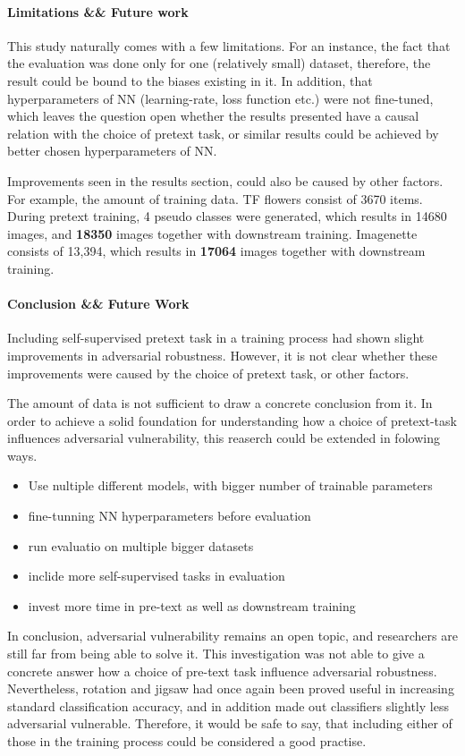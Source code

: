\paragraph{Limitations \&\& Future work}
This study naturally comes with a few limitations.
For an instance, the fact that the evaluation was done only for one (relatively small) dataset,
therefore, the result could be bound to the biases existing in it.
In addition, that hyperparameters of NN (learning-rate, loss function etc.)
were not fine-tuned, which leaves the question open whether the
results presented have a causal relation with the choice of pretext task,
or similar results could be achieved by better chosen hyperparameters of NN.

Improvements seen in the results section, could also be caused by other factors.
For example, the amount of training data.
TF flowers consist of 3670 items.
During pretext training, 4 pseudo classes were generated,
which results in 14680 images, and \textbf{18350} images together with downstream training.
Imagenette consists of 13,394, which results in \textbf{17064} images together with downstream training.



\paragraph{Conclusion \&\& Future Work}
Including self-supervised pretext task in a training process had shown slight improvements in adversarial robustness.
However, it is not clear whether these improvements were caused by the choice of pretext task, or other factors.

The amount of data is not sufficient to draw a concrete conclusion from it.
In order to achieve a solid foundation for understanding how a choice of pretext-task influences adversarial vulnerability,
this reaserch could be extended in folowing ways.
\begin{itemize}
    \item Use nultiple different models, with bigger number of trainable parameters
    \item fine-tunning NN hyperparameters before evaluation
    \item run evaluatio on multiple bigger datasets
    \item inclide more self-supervised tasks in evaluation
    \item invest more time in pre-text as well as downstream training
\end{itemize}


In conclusion, adversarial vulnerability remains an open topic,
and researchers are still far from being able to solve it.
This investigation was not able to give a concrete answer how a choice of pre-text task influence adversarial robustness.
\\
Nevertheless, rotation and jigsaw had once again been proved useful in increasing standard classification accuracy,
and in addition made out classifiers slightly less adversarial vulnerable.
Therefore, it would be safe to say, that including either of those in the training process could be considered a good practise.


